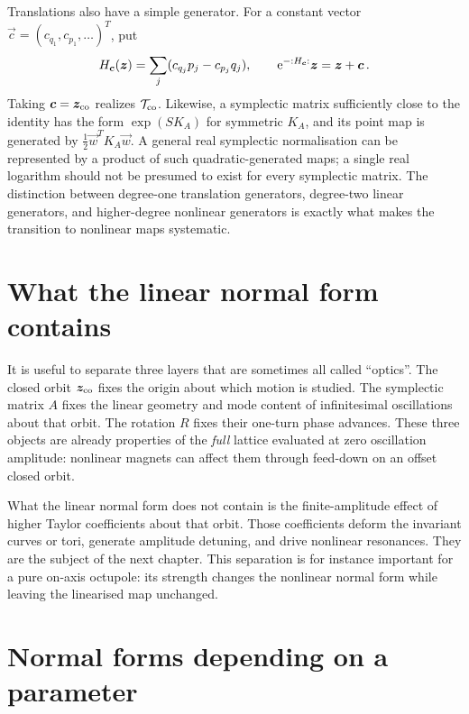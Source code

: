 Translations also have a simple generator. For a constant vector
$\vec c = (c_{q_1},c_{p_1},\ldots)^T$, put
\begin{equation}
    H_{\vec c}(\vec z) = \sum_j(c_{q_j}p_j-c_{p_j}q_j),
    \qquad
    \e^{-\lie{H_{\vec c}}}\vec z = \vec z + \vec c\,.
\end{equation}
Taking $\vec c = \vec z_{\rm co}$ realizes $\mathcal T_{\rm co}$.
Likewise, a symplectic matrix sufficiently close to the identity has
the form $\exp(SK_A)$ for symmetric $K_A$, and its point map is
generated by $\tfrac12\vec w^TK_A\vec w$.
A general real symplectic normalisation can be represented by a
product of such quadratic-generated maps; a single real logarithm
should not be presumed to exist for every symplectic matrix.
The distinction between degree-one translation generators,
degree-two linear generators, and higher-degree nonlinear generators
is exactly what makes the transition to nonlinear maps systematic.



\section{What the linear normal form contains}
\label{sec:lnf-scope}

It is useful to separate three layers that are sometimes all called
``optics''.  The closed orbit $\vec z_{\rm co}$ fixes the origin about which
motion is studied.  The symplectic matrix $A$ fixes the linear geometry and
mode content of infinitesimal oscillations about that orbit.  The rotation
$R$ fixes their one-turn phase advances.  These three objects are already
properties of the \emph{full} lattice evaluated at zero oscillation
amplitude: nonlinear magnets can affect them through feed-down on an offset
closed orbit.

What the linear normal form does not contain is the finite-amplitude effect
of higher Taylor coefficients about that orbit.  Those coefficients deform
the invariant curves or tori, generate amplitude detuning, and drive
nonlinear resonances.  They are the subject of the next chapter.  This
separation is for instance important for a pure on-axis octupole: its
strength changes the nonlinear normal form while leaving the linearised map
unchanged.



\section{Normal forms depending on a parameter}
\label{sec:lnf-parameters}

